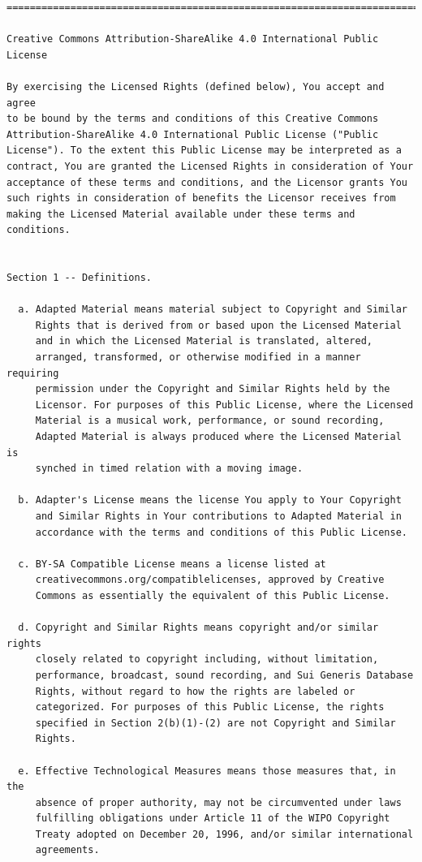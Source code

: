 \documentclass[12pt,spanish,]{scrartcl}
\begin{document}
\begin{verbatim}
=======================================================================

Creative Commons Attribution-ShareAlike 4.0 International Public
License

By exercising the Licensed Rights (defined below), You accept and agree
to be bound by the terms and conditions of this Creative Commons
Attribution-ShareAlike 4.0 International Public License ("Public
License"). To the extent this Public License may be interpreted as a
contract, You are granted the Licensed Rights in consideration of Your
acceptance of these terms and conditions, and the Licensor grants You
such rights in consideration of benefits the Licensor receives from
making the Licensed Material available under these terms and
conditions.


Section 1 -- Definitions.

  a. Adapted Material means material subject to Copyright and Similar
     Rights that is derived from or based upon the Licensed Material
     and in which the Licensed Material is translated, altered,
     arranged, transformed, or otherwise modified in a manner requiring
     permission under the Copyright and Similar Rights held by the
     Licensor. For purposes of this Public License, where the Licensed
     Material is a musical work, performance, or sound recording,
     Adapted Material is always produced where the Licensed Material is
     synched in timed relation with a moving image.

  b. Adapter's License means the license You apply to Your Copyright
     and Similar Rights in Your contributions to Adapted Material in
     accordance with the terms and conditions of this Public License.

  c. BY-SA Compatible License means a license listed at
     creativecommons.org/compatiblelicenses, approved by Creative
     Commons as essentially the equivalent of this Public License.

  d. Copyright and Similar Rights means copyright and/or similar rights
     closely related to copyright including, without limitation,
     performance, broadcast, sound recording, and Sui Generis Database
     Rights, without regard to how the rights are labeled or
     categorized. For purposes of this Public License, the rights
     specified in Section 2(b)(1)-(2) are not Copyright and Similar
     Rights.

  e. Effective Technological Measures means those measures that, in the
     absence of proper authority, may not be circumvented under laws
     fulfilling obligations under Article 11 of the WIPO Copyright
     Treaty adopted on December 20, 1996, and/or similar international
     agreements.


\end{verbatim}
\end{document}
